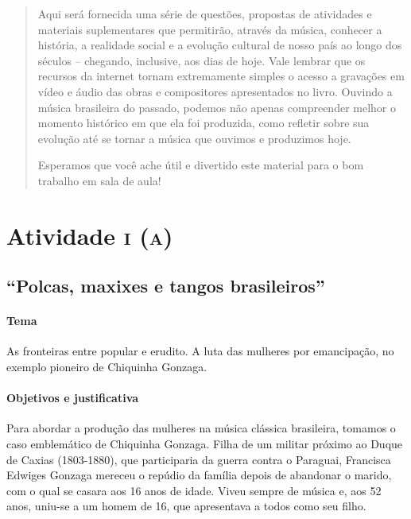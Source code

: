 \documentclass[11pt]{extarticle}
\begin{document}
\begin{abstract}
Aqui será fornecida uma série de questões, propostas de atividades e
materiais suplementares que permitirão, através da música, conhecer a
história, a realidade social e a evolução cultural de nosso país ao
longo dos séculos -- chegando, inclusive, aos dias de hoje. Vale lembrar
que os recursos da internet tornam extremamente simples o acesso a
gravações em vídeo e áudio das obras e compositores apresentados no
livro. Ouvindo a música brasileira do passado, podemos não apenas
compreender melhor o momento histórico em que ela foi produzida, como
refletir sobre sua evolução até se tornar a música que ouvimos e
produzimos hoje.

Esperamos que você ache útil e divertido este material para o bom
trabalho em sala de aula!

\end{abstract}

\tableofcontents


\section{Atividade \textsc{i (a)}}

\subsection{``Polcas, maxixes e tangos brasileiros''}

\paragraph{Tema} As fronteiras entre popular e erudito. A luta das
mulheres por emancipação, no exemplo pioneiro de Chiquinha Gonzaga.



\paragraph{Objetivos e justificativa}

Para abordar a produção das mulheres na música clássica brasileira,
tomamos o caso emblemático de Chiquinha Gonzaga. Filha de um militar
próximo ao Duque de Caxias (1803-1880), que participaria da guerra
contra o Paraguai, Francisca Edwiges Gonzaga mereceu o repúdio da
família depois de abandonar o marido, com o qual se casara aos 16 anos
de idade. Viveu sempre de música e, aos 52 anos, uniu-se a um homem de
16, que apresentava a todos como seu filho.
\end{document}
